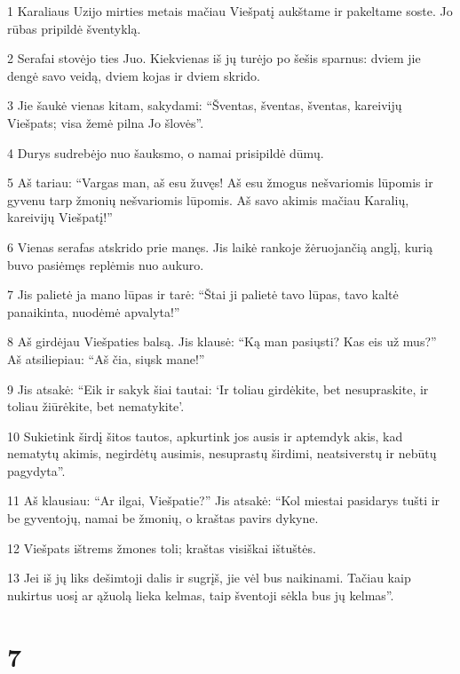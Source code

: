 \par 1 Karaliaus Uzijo mirties metais mačiau Viešpatį aukštame ir pakeltame soste. Jo rūbas pripildė šventyklą. 
\par 2 Serafai stovėjo ties Juo. Kiekvienas iš jų turėjo po šešis sparnus: dviem jie dengė savo veidą, dviem kojas ir dviem skrido. 
\par 3 Jie šaukė vienas kitam, sakydami: “Šventas, šventas, šventas, kareivijų Viešpats; visa žemė pilna Jo šlovės”. 
\par 4 Durys sudrebėjo nuo šauksmo, o namai prisipildė dūmų. 
\par 5 Aš tariau: “Vargas man, aš esu žuvęs! Aš esu žmogus nešvariomis lūpomis ir gyvenu tarp žmonių nešvariomis lūpomis. Aš savo akimis mačiau Karalių, kareivijų Viešpatį!” 
\par 6 Vienas serafas atskrido prie manęs. Jis laikė rankoje žėruojančią anglį, kurią buvo pasiėmęs replėmis nuo aukuro. 
\par 7 Jis palietė ja mano lūpas ir tarė: “Štai ji palietė tavo lūpas, tavo kaltė panaikinta, nuodėmė apvalyta!” 
\par 8 Aš girdėjau Viešpaties balsą. Jis klausė: “Ką man pasiųsti? Kas eis už mus?” Aš atsiliepiau: “Aš čia, siųsk mane!” 
\par 9 Jis atsakė: “Eik ir sakyk šiai tautai: ‘Ir toliau girdėkite, bet nesupraskite, ir toliau žiūrėkite, bet nematykite’. 
\par 10 Sukietink širdį šitos tautos, apkurtink jos ausis ir aptemdyk akis, kad nematytų akimis, negirdėtų ausimis, nesuprastų širdimi, neatsiverstų ir nebūtų pagydyta”. 
\par 11 Aš klausiau: “Ar ilgai, Viešpatie?” Jis atsakė: “Kol miestai pasidarys tušti ir be gyventojų, namai be žmonių, o kraštas pavirs dykyne. 
\par 12 Viešpats ištrems žmones toli; kraštas visiškai ištuštės. 
\par 13 Jei iš jų liks dešimtoji dalis ir sugrįš, jie vėl bus naikinami. Tačiau kaip nukirtus uosį ar ąžuolą lieka kelmas, taip šventoji sėkla bus jų kelmas”.



\chapter{7}


